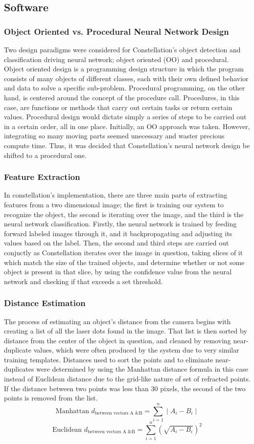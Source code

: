 \subsection{Software}
\subsubsection{Object Oriented vs. Procedural Neural Network Design}
Two design paradigms were considered for Constellation's object detection and classification driving neural network; object oriented (OO) and procedural. Object oriented design is a programming design structure in which the program consists of many objects of different classes, each with their own defined behavior and data to solve a specific sub-problem. Procedural programming, on the other hand, is centered around the concept of the procedure call. Procedures, in this case, are functions or methods that carry out certain tasks or return certain values. Procedural design would dictate simply a series of steps to be carried out in a certain order, all in one place. Initially, an OO approach was taken. However, integrating so many moving parts seemed unecessary and waster precious compute time. Thus, it was decided that Constellation's neural network design be shifted to a procedural one.
\subsubsection{Feature Extraction}
In constellation's implementation, there are three main parts of extracting features from a two dimensional image; the first is training our system to recognize the object, the second is iterating over the image, and the third is the neural network classification. Firstly, the neural network is trained by feeding forward labeled images through it, and it backpropagating and adjusting its values based on the label. Then, the second and third steps are carried out conjuctly as Constellation iterates over the image in question, taking slices of it which match the size of the trained objects, and determine whether or not some object is present in that slice, by using the confidence value from the neural network and checking if that exceeds a set threshold.
\subsubsection{Distance Estimation}
The process of estimating an object's distance from the camera begins with creating a list of all the laser dots found in the image. That list is then sorted by distance from the center of the object in question, and cleaned by removing near-duplicate values, which were often produced by the system due to very similar training templates. Distances used to sort the points and to eliminate near-duplicates were determined by using the Manhattan distance formula in this case instead of Euclidean distance due to the grid-like nature of set of refracted points. If the distance between two points was less than 30 pixels, the second of the two points is removed from the list.
$$\text{Manhattan }d_{\text{between vectors A \& B}}=\sum \limits_{i=1}^n \mid A_i-B_i\mid$$
$$\text{Euclidean }d_{\text{between vectors A \& B}}=\sum \limits_{i=1}^n (\sqrt{A_i-B_i})^2$$

